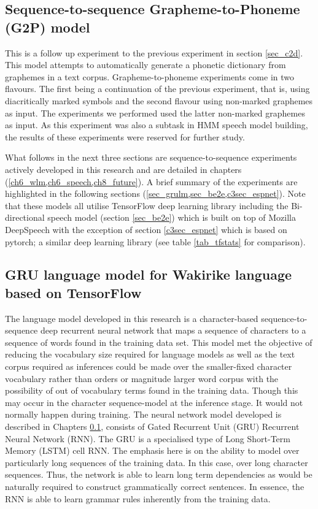 \subsection{Sequence-to-sequence Grapheme-to-Phoneme (G2P) model}
This is a follow up experiment to the previous experiment in section \ref{sec_c2d}. This model attempts to automatically generate a phonetic dictionary from graphemes in a text corpus. Grapheme-to-phoneme experiments come in two flavours. The first being a continuation of the previous experiment, that is, using diacritically marked symbols and the second flavour using non-marked graphemes as input.  The experiments we performed used the latter non-marked graphemes as input. As this experiment was also a subtask in HMM speech model building,  the results of these experiments were reserved for further study.  

What follows in the next three sections are sequence-to-sequence experiments actively developed in this research and are detailed in chapters (\ref{ch6_wlm,ch6_speech,ch8_future}).  A brief summary of the experiments are highlighted in the following sections (\ref{sec_grulm,sec_be2e,c3sec_espnet}).  Note that these models all utilise TensorFlow deep learning library including the Bi-directional speech model (section \ref{sec_be2e}) which is built on top of Mozilla DeepSpeech with the exception of section \ref{c3sec_espnet} which is based on pytorch; a similar deep learning library (see table \ref{tab_tfstats} for comparison).

\subsection{GRU language model for Wakirike language based on TensorFlow}\label{sec_grulm}
The language model developed in this research is a character-based sequence-to-sequence deep recurrent neural network that maps a sequence of characters to a sequence of words found in the training data set. This model met the objective of reducing the vocabulary size required for language models as well as the text corpus required as inferences could be made over the smaller-fixed character vocabulary rather than orders or magnitude larger word corpus with the possibility of out of vocabulary terms found in the training data.  Though this may occur in the character sequence-model at the inference stage.  It would not normally happen during training.  The neural network model developed is described in Chapters \ref{}, consists of Gated Recurrent Unit (GRU) Recurrent Neural Network (RNN). The GRU is a specialised type of Long Short-Term Memory (LSTM) cell RNN.  The emphasis here is on the ability to model over particularly long sequences of the training data.  In this case, over long character sequences.  Thus, the network is able to learn long term dependencies as would be naturally required to construct grammatically correct sentences.  In essence, the RNN is able to learn grammar rules inherently from the training data.

